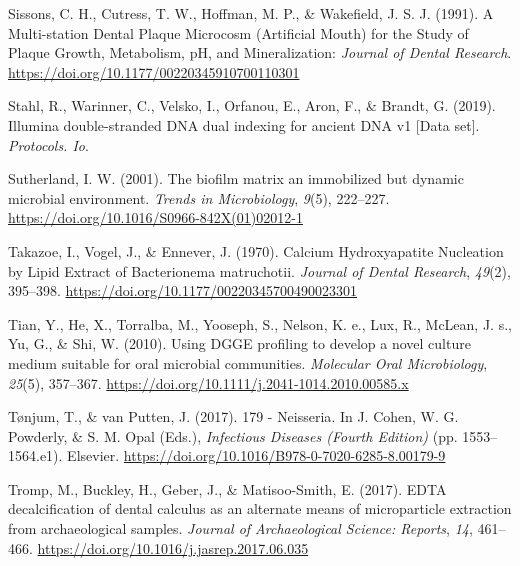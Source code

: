 \documentclass[
  b5paper,
]{book}
\newlength{\cslhangindent}
\newlength{\cslentryspacingunit} %
\newenvironment{CSLReferences}[2] %
 {%
  \setlength{\parindent}{0pt}
  \ifodd #1
  \let\oldpar\par
  \def\par{\hangindent=\cslhangindent\oldpar}
  \fi
  \setlength{\parskip}{#2\cslentryspacingunit}
 }%
 {}
\begin{document}
\begin{CSLReferences}{1}{0}
\leavevmode{}%
Sissons, C. H., Cutress, T. W., Hoffman, M. P., \& Wakefield, J. S. J.
(1991). A {Multi-station Dental Plaque Microcosm} ({Artificial Mouth})
for the {Study} of {Plaque Growth}, {Metabolism}, {pH}, and
{Mineralization}: \emph{Journal of Dental Research}.
\url{https://doi.org/10.1177/00220345910700110301}

\leavevmode{}%
Stahl, R., Warinner, C., Velsko, I., Orfanou, E., Aron, F., \& Brandt,
G. (2019). Illumina double-stranded {DNA} dual indexing for ancient
{DNA} v1 {[}{Data} set{]}. \emph{Protocols. Io}.

\leavevmode{}%
Sutherland, I. W. (2001). The biofilm matrix {\textendash} an
immobilized but dynamic microbial environment. \emph{Trends in
Microbiology}, \emph{9}(5), 222--227.
\url{https://doi.org/10.1016/S0966-842X(01)02012-1}

\leavevmode{}%
Takazoe, I., Vogel, J., \& Ennever, J. (1970). Calcium {Hydroxyapatite
Nucleation} by {Lipid Extract} of {Bacterionema} matruchotii.
\emph{Journal of Dental Research}, \emph{49}(2), 395--398.
\url{https://doi.org/10.1177/00220345700490023301}

\leavevmode{}%
Tian, Y., He, X., Torralba, M., Yooseph, S., Nelson, K. e., Lux, R.,
McLean, J. s., Yu, G., \& Shi, W. (2010). Using {DGGE} profiling to
develop a novel culture medium suitable for oral microbial communities.
\emph{Molecular Oral Microbiology}, \emph{25}(5), 357--367.
\url{https://doi.org/10.1111/j.2041-1014.2010.00585.x}

\leavevmode{}%
Tønjum, T., \& van Putten, J. (2017). 179 - {Neisseria}. In J. Cohen, W.
G. Powderly, \& S. M. Opal (Eds.), \emph{Infectious {Diseases} ({Fourth
Edition})} (pp. 1553--1564.e1). {Elsevier}.
\url{https://doi.org/10.1016/B978-0-7020-6285-8.00179-9}

\leavevmode{}%
Tromp, M., Buckley, H., Geber, J., \& Matisoo-Smith, E. (2017). {EDTA}
decalcification of dental calculus as an alternate means of
microparticle extraction from archaeological samples. \emph{Journal of
Archaeological Science: Reports}, \emph{14}, 461--466.
\url{https://doi.org/10.1016/j.jasrep.2017.06.035}


\end{CSLReferences}
\end{document}
